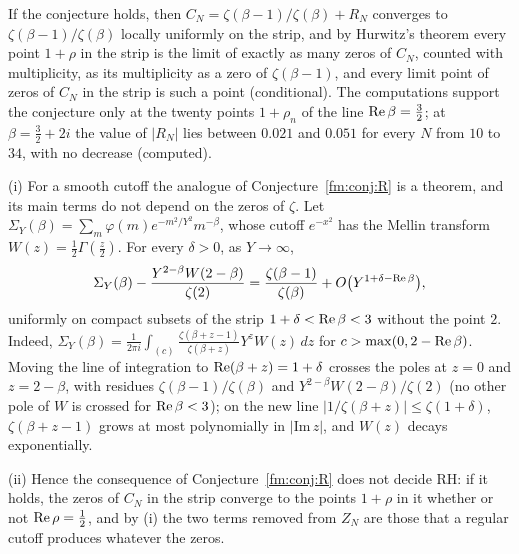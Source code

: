 If the conjecture holds, then $C_N=\zeta(\beta-1)/\zeta(\beta)+R_N$ converges to $\zeta(\beta-1)/\zeta(\beta)$ locally uniformly on the strip, and by Hurwitz's theorem every point $1+\rho$ in the strip is the limit of exactly as many zeros of $C_N$, counted with multiplicity, as its multiplicity as a zero of $\zeta(\beta-1)$, and every limit point of zeros of $C_N$ in the strip is such a point (conditional). The computations support the conjecture only at the twenty points $1+\rho_n$ of the line $\operatorname{Re}\beta=\frac32$; at $\beta=\frac32+2i$ the value of $|R_N|$ lies between $0.021$ and $0.051$ for every $N$ from $10$ to $34$, with no decrease (computed).

\begin{remark}\label{fm:rem:neutral}
(i) For a smooth cutoff the analogue of Conjecture~\ref{fm:conj:R} is a theorem, and its main terms do not depend on the zeros of $\zeta$. Let $\Sigma_Y(\beta)=\sum_m\varphi(m)e^{-m^2/Y^2}m^{-\beta}$, whose cutoff $e^{-x^2}$ has the Mellin transform $W(z)=\frac12\Gamma(\frac z2)$. For every $\delta>0$, as $Y\to\infty$,
\[
\Sigma_Y(\beta)-\frac{Y^{2-\beta}W(2-\beta)}{\zeta(2)}=\frac{\zeta(\beta-1)}{\zeta(\beta)}+O\big(Y^{1+\delta-\operatorname{Re}\beta}\big),
\]
uniformly on compact subsets of the strip $1+\delta<\operatorname{Re}\beta<3$ without the point $2$. Indeed, $\Sigma_Y(\beta)=\frac1{2\pi i}\int_{(c)}\frac{\zeta(\beta+z-1)}{\zeta(\beta+z)}Y^zW(z)\,dz$ for $c>\max(0,2-\operatorname{Re}\beta)$. Moving the line of integration to $\operatorname{Re}(\beta+z)=1+\delta$ crosses the poles at $z=0$ and $z=2-\beta$, with residues $\zeta(\beta-1)/\zeta(\beta)$ and $Y^{2-\beta}W(2-\beta)/\zeta(2)$ (no other pole of $W$ is crossed for $\operatorname{Re}\beta<3$); on the new line $|1/\zeta(\beta+z)|\le\zeta(1+\delta)$, $\zeta(\beta+z-1)$ grows at most polynomially in $|\mathrm{Im}\,z|$, and $W(z)$ decays exponentially.

(ii) Hence the consequence of Conjecture~\ref{fm:conj:R} does not decide RH: if it holds, the zeros of $C_N$ in the strip converge to the points $1+\rho$ in it whether or not $\operatorname{Re}\rho=\frac12$, and by (i) the two terms removed from $Z_N$ are those that a regular cutoff produces whatever the zeros.


\end{remark}
